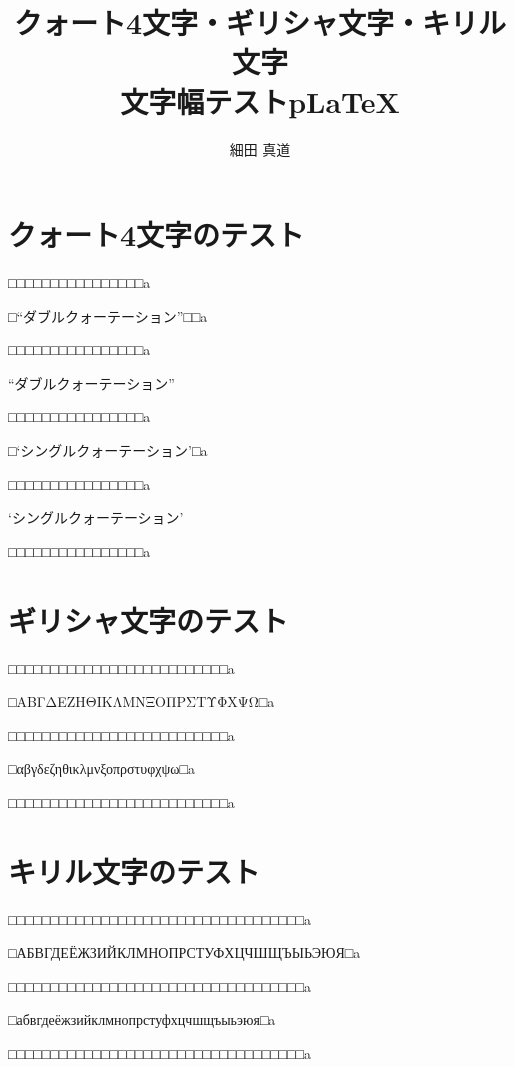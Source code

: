 \documentclass{jsarticle}
\title{クォート4文字・ギリシャ文字・キリル文字 \\
  文字幅テストp\LaTeX}
\author{細田 真道}
\begin{document}
\maketitle

\section{クォート4文字のテスト}

□□□□□□□□□□□□□□□□a

□“ダブルクォーテーション”□□a

□□□□□□□□□□□□□□□□a

“ダブルクォーテーション”

□□□□□□□□□□□□□□□□a

□‘シングルクォーテーション’□a

□□□□□□□□□□□□□□□□a

‘シングルクォーテーション’

□□□□□□□□□□□□□□□□a

\section{ギリシャ文字のテスト}

□□□□□□□□□□□□□□□□□□□□□□□□□□a

□ΑΒΓΔΕΖΗΘΙΚΛΜΝΞΟΠΡΣΤΥΦΧΨΩ□a

□□□□□□□□□□□□□□□□□□□□□□□□□□a

□αβγδεζηθικλμνξοπρστυφχψω□a

□□□□□□□□□□□□□□□□□□□□□□□□□□a

\section{キリル文字のテスト}

□□□□□□□□□□□□□□□□□□□□□□□□□□□□□□□□□□□a

□АБВГДЕЁЖЗИЙКЛМНОПРСТУФХЦЧШЩЪЫЬЭЮЯ□a

□□□□□□□□□□□□□□□□□□□□□□□□□□□□□□□□□□□a

□абвгдеёжзийклмнопрстуфхцчшщъыьэюя□a

□□□□□□□□□□□□□□□□□□□□□□□□□□□□□□□□□□□a
\end{document}
